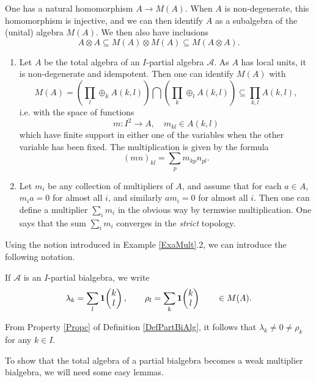 One has a natural homomorphism $A\rightarrow M(A)$. When $A$ is non-degenerate,  this homomorphism is injective, and we can then identify $A$ as a subalgebra of the (unital) algebra $M(A)$. We then also have inclusions \[A\otimes A\subseteq M(A)\otimes M(A)\subseteq M(A\otimes A).\]

\begin{Exa}\label{ExaMult} \begin{enumerate}
\item Let $A$ be the total algebra of an $I$-partial algebra $\mathscr{A}$. As $A$ has local units, it is non-degenerate and idempotent. Then one can identify $M(A)$ with \[M(A) = \left(\prod_l \oplus_k A(k,l)\right) \bigcap \left(\prod_k\oplus_l A(k,l)\right) \subseteq \prod_{k,l} A(k,l),\] i.e. with the space of functions \[m:I^2\rightarrow A,\quad m_{kl}\in A(k,l)\] which have finite support in either one of the variables when the other variable has been fixed. The multiplication is given by the formula \[(mn)_{kl} = \sum_p m_{kp}n_{pl}.\]
\item Let $m_i$ be any collection of multipliers of $A$, and assume that for each $a\in A$, $m_ia =0$ for almost all $i$, and similarly $am_i=0$ for almost all $i$. Then one can define a multiplier $\sum_i m_i$ in the obvious way by termwise multiplication. One says that the sum $\sum_i m_i$ converges in the \emph{strict} topology. 
\end{enumerate}
\end{Exa}

Using the notion introduced in Example \ref{ExaMult}.2, we can introduce the following notation.

\begin{Not}
If $\mathscr{A}$ is an $I$-partial bialgebra, we write \[\lambda_k = \sum_l \mathbf{1}\!\begin{pmatrix} k \\ l\end{pmatrix},\qquad \rho_l = \sum_k\mathbf{1}\!\begin{pmatrix} k \\ l\end{pmatrix} \qquad \in M(A).\]
\end{Not}

\begin{Rem} From Property \ref{Propc} of Definition \ref{DefPartBiAlg}, it follows that $\lambda_k\neq 0\neq \rho_k$ for any $k\in I$. 
\end{Rem} 

To show that the total algebra of a partial bialgebra becomes a weak multiplier bialgebra, we will need some easy lemmas. 

